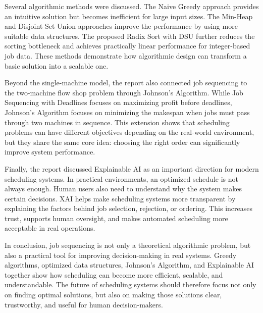 \documentclass[11pt,a4paper]{article}
\begin{document}
Several algorithmic methods were discussed. The Naive Greedy approach provides an intuitive solution but becomes inefficient for large input sizes. The Min-Heap and Disjoint Set Union approaches improve the performance by using more suitable data structures. The proposed Radix Sort with DSU further reduces the sorting bottleneck and achieves practically linear performance for integer-based job data. These methods demonstrate how algorithmic design can transform a basic solution into a scalable one.

Beyond the single-machine model, the report also connected job sequencing to the two-machine flow shop problem through Johnson's Algorithm. While Job Sequencing with Deadlines focuses on maximizing profit before deadlines, Johnson's Algorithm focuses on minimizing the makespan when jobs must pass through two machines in sequence. This extension shows that scheduling problems can have different objectives depending on the real-world environment, but they share the same core idea: choosing the right order can significantly improve system performance.

Finally, the report discussed Explainable AI as an important direction for modern scheduling systems. In practical environments, an optimized schedule is not always enough. Human users also need to understand why the system makes certain decisions. XAI helps make scheduling systems more transparent by explaining the factors behind job selection, rejection, or ordering. This increases trust, supports human oversight, and makes automated scheduling more acceptable in real operations.

In conclusion, job sequencing is not only a theoretical algorithmic problem, but also a practical tool for improving decision-making in real systems. Greedy algorithms, optimized data structures, Johnson's Algorithm, and Explainable AI together show how scheduling can become more efficient, scalable, and understandable. The future of scheduling systems should therefore focus not only on finding optimal solutions, but also on making those solutions clear, trustworthy, and useful for human decision-makers.
\end{document}
